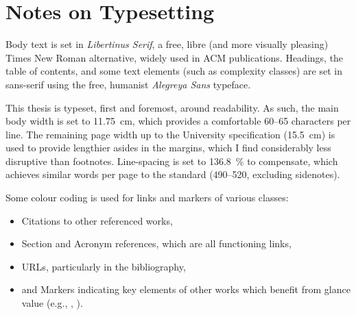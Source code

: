 \chapter*{Notes on Typesetting}

Body text is set in \emph{Libertinus Serif}, a free, libre (and more visually pleasing) Times New Roman alternative, widely used in ACM publications.
Headings, the table of contents, and some text elements (such as complexity classes) are set in sans-serif using the free, humanist \emph{Alegreya Sans} typeface.

This thesis is typeset, first and foremost, around readability.
As such, the main body width is set to \qty{11.75}{\centi\metre}, which provides a comfortable \numrange{60}{65} characters per line.
The remaining page width up to the University specification (\qty{15.5}{\centi\metre}) is used to provide lengthier asides in the margins, which I find considerably less disruptive than footnotes.
Line-spacing is set to \qty{136.8}{\percent} to compensate, which achieves similar words per page to the standard (\numrange{490}{520}, excluding sidenotes).

Some colour coding is used for links and markers of various classes:
\begin{itemize}
	\item {\color{kthesis-cite}Citations} to other referenced works,
	\item {\color{kthesis-internal}Section and Acronym} references, which are all functioning links,
	\item {\color{kthesis-url}URLs}, particularly in the bibliography,
	\item and {\color{kthesis-glance}Markers} indicating key elements of other works which benefit from glance value (e.g., \rllitstate, \rllitact).
\end{itemize}